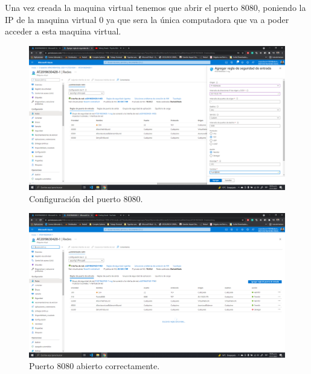 \documentclass[11pt]{article}
\begin{document}
		Una vez creada la maquina virtual tenemos que abrir el puerto 8080, poniendo la IP de la maquina virtual 0 ya que sera la única computadora que va a poder acceder a esta maquina virtual.
		\begin{figure}[H]
			\centering
			\includegraphics[scale=0.34]{resources/puerto80801.png}
			\caption{Configuración del puerto 8080.}\label{fig:picture}
		\end{figure}
		\begin{figure}[H]
			\centering
			\includegraphics[scale=0.34]{resources/puertook1.png}
			\caption{Puerto 8080 abierto correctamente.}\label{fig:picture}
		\end{figure}
\end{document}
